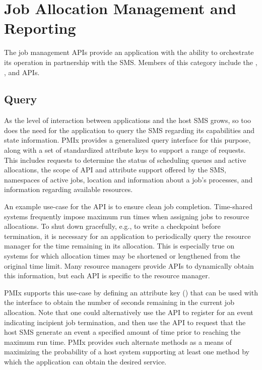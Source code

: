 \chapter{Job Allocation Management and Reporting}
\label{chap:api_job_mgmt}

The job management \acp{API} provide an application with the ability to orchestrate its operation in partnership with the \ac{SMS}.
Members of this category include the , , and  \acp{API}.

\section{Query}
\label{chap:api_proc_mgmt:query}

As the level of interaction between applications and the host \ac{SMS} grows, so too does the need for the application to query the \ac{SMS} regarding its capabilities and state information. \ac{PMIx} provides a generalized query interface for this purpose, along with a set of standardized attribute keys to support a range of requests. This includes requests to determine the status of scheduling queues and active allocations, the scope of \ac{API} and attribute support offered by the \ac{SMS}, namespaces of active jobs, location and information about a job's processes, and information regarding available resources.

An example use-case for the  \ac{API} is to ensure clean job completion. Time-shared systems frequently impose maximum run times when assigning jobs to resource allocations. To shut down gracefully, e.g., to write a checkpoint before termination, it is necessary for an application to periodically query the resource manager for the time remaining in its allocation. This is especially true on systems for which allocation times may be shortened or lengthened from the original time limit. Many resource managers provide \acp{API} to dynamically obtain this information, but each \ac{API} is specific to the resource manager.

\ac{PMIx} supports this use-case by defining an attribute key () that can be used with the  interface to obtain the number of seconds remaining in the current job allocation. Note that one could alternatively use the  \ac{API} to register for an event indicating incipient job termination, and then use the  \ac{API} to request that the host \ac{SMS} generate an event a specified amount of time prior to reaching the maximum run time. \ac{PMIx} provides such alternate methods as a means of maximizing the probability of a host system supporting at least one method by which the application can obtain the desired service.

